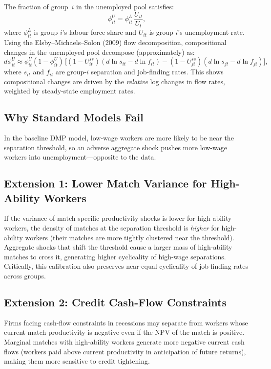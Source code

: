 The fraction of group~$i$ in the unemployed pool satisfies:
\begin{equation}
  \phi^U_{it} = \phi^L_{it}\,\frac{U_{it}}{U_t},
  \label{eq:mueller_phi}
\end{equation}
where $\phi^L_{it}$ is group $i$'s labour force share and $U_{it}$ is group
$i$'s unemployment rate. Using the Elsby--Michaels--Solon (2009) flow
decomposition, compositional changes in the unemployed pool decompose
(approximately) as:
\begin{equation}
  d\phi^U_{it} \approx \phi^U_{it}(1-\phi^U_{it})\,\bigl[
    (1-U^{ss}_{it})(d\ln s_{it}-d\ln f_{it})
    - (1-U^{ss}_{jt})(d\ln s_{jt}-d\ln f_{jt})
  \bigr],
  \label{eq:mueller_decomp}
\end{equation}
where $s_{it}$ and $f_{it}$ are group-$i$ separation and job-finding rates.
This shows compositional changes are driven by the \emph{relative} log changes
in flow rates, weighted by steady-state employment rates.

\subsection*{Why Standard Models Fail}

In the baseline DMP model, low-wage workers are more likely to be near the
separation threshold, so an adverse aggregate shock pushes more low-wage
workers into unemployment---opposite to the data.

\subsection*{Extension 1: Lower Match Variance for High-Ability Workers}

If the variance of match-specific productivity shocks is lower for high-ability
workers, the density of matches at the separation threshold is
\emph{higher} for high-ability workers (their matches are more tightly
clustered near the threshold). Aggregate shocks that shift the threshold
cause a larger mass of high-ability matches to cross it, generating higher
cyclicality of high-wage separations. Critically, this calibration also
preserves near-equal cyclicality of job-finding rates across groups.

\subsection*{Extension 2: Credit Cash-Flow Constraints}

Firms facing cash-flow constraints in recessions may separate from workers
whose current match productivity is negative even if the NPV of the match is
positive. Marginal matches with high-ability workers generate more negative
current cash flows (workers paid above current productivity in anticipation
of future returns), making them more sensitive to credit tightening.

